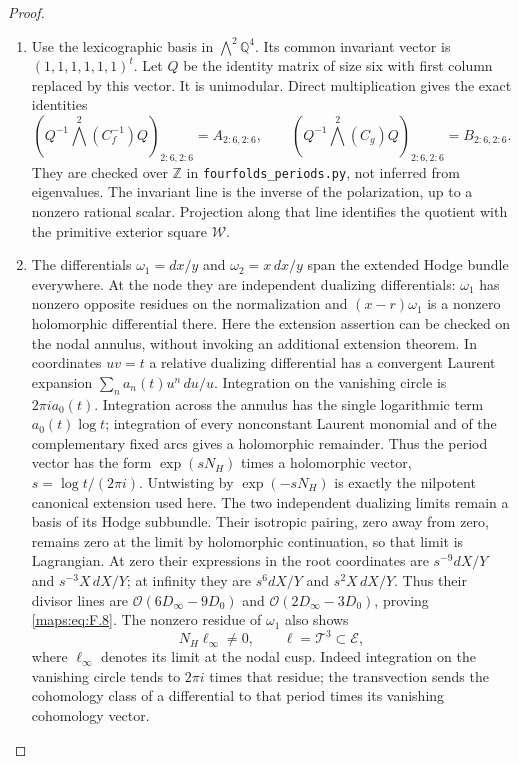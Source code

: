 \begin{proof}
\begin{enumerate}[label=\arabic*.]
\item Use the lexicographic basis in $\bigwedge^2\mathbb Q^4$.
Its common invariant vector is $(1,1,1,1,1,1)^t$.
Let $Q$ be the identity matrix of size six with first column
replaced by this vector.  It is unimodular.  Direct multiplication
gives the exact identities
\[
 \left(Q^{-1}\bigwedge^2(C_f^{-1})Q\right)_{2:6,2:6}
   =A_{2:6,2:6},\qquad
 \left(Q^{-1}\bigwedge^2(C_g)Q\right)_{2:6,2:6}
   =B_{2:6,2:6}.
 \tag{F.11}\label{maps:eq:F.11}
\]
They are checked over $\mathbb Z$ in
\texttt{fourfolds\_periods.py}, not inferred from eigenvalues.
The invariant line is the inverse of the polarization, up to a
nonzero rational scalar.  Projection along that line identifies
the quotient with the primitive exterior square $\mathcal W$.

\item The differentials $\omega_1=dx/y$ and $\omega_2=x\,dx/y$ span
the extended Hodge bundle everywhere.  At the node they are
independent dualizing differentials: $\omega_1$ has nonzero
opposite residues on the normalization and
$(x-r)\omega_1$ is a nonzero holomorphic differential there.
Here the extension assertion can be checked on the nodal
annulus, without invoking an additional extension theorem.
In coordinates $uv=t$ a relative dualizing differential has
a convergent Laurent expansion
$\sum_n a_n(t)u^n\,du/u$.  Integration on the vanishing circle
is $2\pi i a_0(t)$.  Integration across the annulus has the
single logarithmic term $a_0(t)\log t$; integration of every
nonconstant Laurent monomial and of the complementary fixed
arcs gives a holomorphic remainder.  Thus the period vector
has the form $\exp(sN_H)$ times a holomorphic vector,
$s=\log t/(2\pi i)$.  Untwisting by $\exp(-sN_H)$ is exactly
the nilpotent canonical extension used here.  The two independent
dualizing limits remain a basis of its Hodge subbundle.
Their isotropic pairing, zero away from zero, remains zero
at the limit by holomorphic continuation, so that limit is
Lagrangian.
At zero their expressions in the root coordinates are
$s^{-9}dX/Y$ and $s^{-3}X\,dX/Y$; at infinity they are
$s^6dX/Y$ and $s^2X\,dX/Y$.
Thus their divisor lines are
$\mathcal O(6D_\infty-9D_0)$ and
$\mathcal O(2D_\infty-3D_0)$, proving \eqref{maps:eq:F.8}.
The nonzero residue of $\omega_1$ also shows
\[
 N_H\ell_\infty\ne0,
 \qquad \ell=\mathcal T^3\subset\mathcal E,
 \tag{F.12}\label{maps:eq:F.12}
\]
where $\ell_\infty$ denotes its limit at the nodal cusp.
Indeed integration on the vanishing circle tends to
$2\pi i$ times that residue; the transvection sends the cohomology
class of a differential to that period times its vanishing
cohomology vector.

\end{enumerate}
\end{proof}




